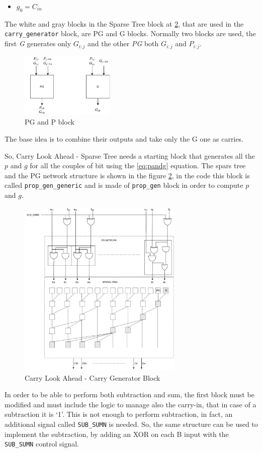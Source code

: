 \begin{itemize}
\begin{itemize}
		\item $g_0 = C_{in}$
	\end{itemize}
	The white and gray blocks in the Sparse Tree block at \ref{fig:pg_network}, that are used in the \texttt{carry\_generator} block, are PG and G blocks.
	Normally two blocks are used, the first \textit{G} generates only $G_{i:j}$ and the other \textit{PG} both $G_{i:j}$ and $P_{i:j}$.
	\begin{figure}[h]
		\centering
		\includegraphics[width=0.4\textwidth]{chapters/5_ExecuteStage/images/PG_and_G.pdf}
		\caption{PG and P block}
		\label{fig:PG_and_G}
	\end{figure}
	The base idea is to combine their outputs and take only the G one as carries.
\end{itemize}
So, Carry Look Ahead - Sparse Tree needs a starting block that generates all the $p$ and $g$ for all the couples of bit using the \ref{eq:pandg} equation. The spars tree and the PG network structure is shown in the figure \ref{fig:pg_network}, in the code this block is called \texttt{prop\_gen\_generic} and is made of \texttt{prop\_gen} block in order to compute $p$ and $g$.
\begin{figure}[H]
	\centering
	\includegraphics[width=0.7\textwidth]{chapters/5_ExecuteStage/images/CLA.pdf}
	\caption{Carry Look Ahead - Carry Generator Block}
	\label{fig:pg_network}
\end{figure}
In order to be able to perform both subtraction and sum, the first block must be modified and must include the logic to manage also the carry-in, that in case of a subtraction it is `1'. This is not enough to perform subtraction, in fact, an additional signal called \texttt{SUB\_SUMN} is needed.
So, the same structure can be used to implement the subtraction, by adding an XOR on each B input with the \texttt{SUB\_SUMN} control signal.

